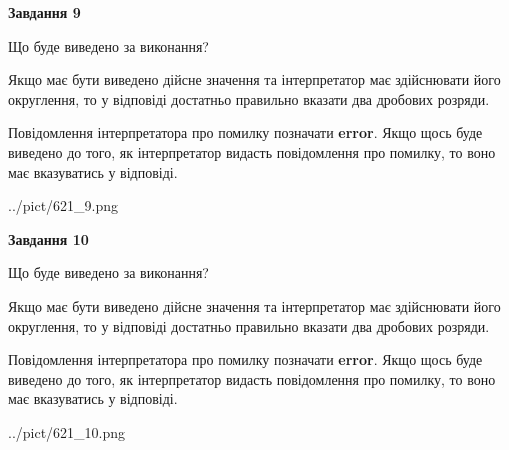 \documentclass[12pt, ukrainian]{article}
\begin{document}
{\begin {Large}
{\begin {center}\textbf{Завдання 9}\end {center}}\par
Що буде виведено за виконання? \par

Якщо має бути виведено дійсне значення та інтерпретатор має здійснювати його округлення, 
то у відповіді достатньо правильно вказати два дробових розряди.

Повідомлення інтерпретатора про помилку позначати \textbf{error}.
Якщо щось буде виведено до того, як інтерпретатор видасть повідомлення про помилку, 
то воно має вказуватись у відповіді. \par

\begin{center}
	{../pict/621_9.png}
\end{center}
\newpage

{\begin {center}\textbf{Завдання 10}\end {center}}\par
Що буде виведено за виконання? \par

Якщо має бути виведено дійсне значення та інтерпретатор має здійснювати його округлення, 
то у відповіді достатньо правильно вказати два дробових розряди.

Повідомлення інтерпретатора про помилку позначати \textbf{error}.
Якщо щось буде виведено до того, як інтерпретатор видасть повідомлення про помилку, 
то воно має вказуватись у відповіді. \par

\begin{center}
	{../pict/621_10.png}
\end{center}
\newpage

\end {Large}}
\end{document}
